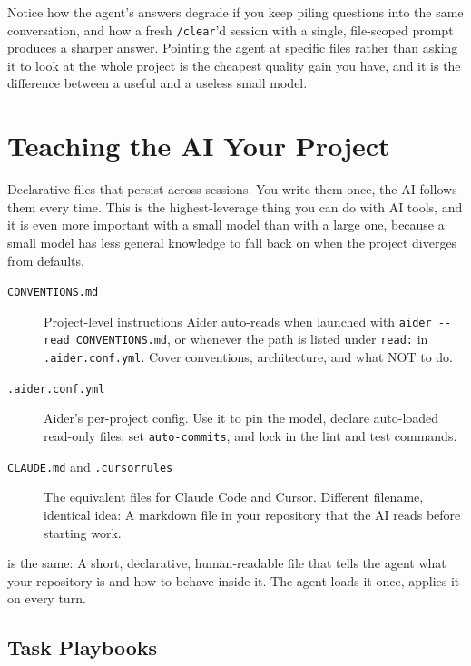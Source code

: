  Notice how the agent's answers degrade if you keep piling
questions into the same conversation, and how a fresh \texttt{/clear}'d session with a single,
file-scoped prompt produces a sharper answer. Pointing the agent at specific files rather than
asking it to look at the whole project is the cheapest quality gain you have, and it is the
difference between a useful and a useless small model.

\newpage
\section{Teaching the AI Your Project}

 Declarative files that persist across sessions. You write them
once, the AI follows them every time. This is the highest-leverage thing you can do with AI tools,
and it is even more important with a small model than with a large one, because a small model has
less general knowledge to fall back on when the project diverges from defaults.

\begin{description}
    \item[\texttt{CONVENTIONS.md}] Project-level instructions Aider auto-reads
    when launched with \texttt{aider -{}-read CONVENTIONS.md}, or whenever the path is listed under
    \texttt{read:} in \texttt{.aider.conf.yml}. Cover conventions, architecture, and what NOT to do.
    \item[\texttt{.aider.conf.yml}] Aider's per-project config. Use it to pin
    the model, declare auto-loaded read-only files, set \texttt{auto-commits}, and lock in the lint
    and test commands.
    \item[\texttt{CLAUDE.md} and \texttt{.cursorrules}] The equivalent files for Claude Code and
    Cursor. Different filename, identical idea: A markdown file in your repository that the AI
    reads before starting work.
\end{description}

 is the same: A short, declarative, human-readable file
that tells the agent what your repository is and how to behave inside it. The agent loads it once,
applies it on every turn.

\subsection{Task Playbooks}

